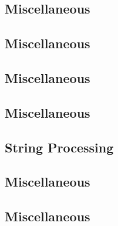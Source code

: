 \subsection{Miscellaneous}
\raggedbottom
\vspace{-.7\baselineskip}\hrulefill
\vspace{0.1\baselineskip}\subsection{Miscellaneous}
\raggedbottom
\vspace{-.7\baselineskip}\hrulefill
\vspace{0.1\baselineskip}\subsection{Miscellaneous}
\raggedbottom
\vspace{-.7\baselineskip}\hrulefill
\vspace{0.1\baselineskip}\subsection{Miscellaneous}
\raggedbottom
\vspace{-.7\baselineskip}\hrulefill
\vspace{0.1\baselineskip}\subsection{String Processing}
\raggedbottom
\vspace{-.7\baselineskip}\hrulefill
\vspace{0.1\baselineskip}\subsection{Miscellaneous}
\raggedbottom
\vspace{-.7\baselineskip}\hrulefill
\vspace{0.1\baselineskip}\subsection{Miscellaneous}
\raggedbottom
\vspace{-.7\baselineskip}\hrulefill
\vspace{0.1\baselineskip}
